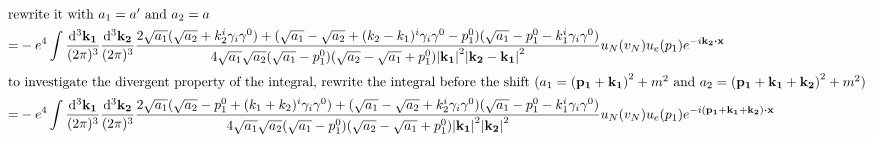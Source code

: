 \documentclass{article}
\newcommand{\g}{\gamma}
\begin{document}
\begin{align*}
  \intertext{rewrite it with $a_1=a'$ and $a_2=a$}
   =&-e^4\int\frac{\dd^3\vb{k_1}}{(2\pi)^3}\frac{\dd^3\vb{k_2}}{(2\pi)^3}
    \frac{2\sqrt{a_1}(\sqrt{a_2}+k_2^i\g_i\g^0)+(\sqrt{a_1}-\sqrt{a_2}+(k_2-k_1)^i\g_i\g^0-p_1^0)(\sqrt{a_1}-p_1^0-k_1^i\g_i\g^0)}{4\sqrt{a_1}\sqrt{a_2}(\sqrt{a_1}-p_1^0)(\sqrt{a_2}-\sqrt{a_1}+p_1^0){\vb{\abs{k_1}}^2\vb{\abs{k_2-k_1}}^2}}
    u_N(v_N)u_e(p_1)e^{-i\vb{k_2}\vdot \vb{x}}\\
  \intertext{to investigate the divergent property of the integral, rewrite the integral before the shift ($a_1=\pqty{\vb{p_1+k_1}}^2+m^2$ and $a_2=\pqty{\vb{p_1+k_1+k_2}}^2+m^2$)}
  =&-e^4\int\frac{\dd^3\vb{k_1}}{(2\pi)^3}\frac{\dd^3\vb{k_2}}{(2\pi)^3}
  \frac{2\sqrt{a_1}(\sqrt{a_2}-p_1^0+(k_1+k_2)^i\g_i\g^0)+(\sqrt{a_1}-\sqrt{a_2}+k_2^i\g_i\g^0)(\sqrt{a_1}-p_1^0-k_1^i\g_i\g^0)}{4\sqrt{a_1}\sqrt{a_2}(\sqrt{a_1}-p_1^0)(\sqrt{a_2}-\sqrt{a_1}+p_1^0){\vb{\abs{k_1}}^2\vb{\abs{k_2}}^2}}
  u_N(v_N)u_e(p_1)e^{-i\vb{(p_1+k_1+k_2)}\vdot \vb{x}}
 \end{align*}
\end{document}

